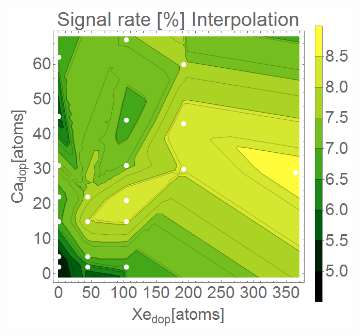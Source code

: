 \begin{figure}[h!]
\centering
\begin{subfigure}[l]{0.5\textwidth}
\includegraphics[width=1\textwidth]{../Images/results/MIR_He_XeCaDop/interpolationSignalRate2.png} 
\end{subfigure}\hfill



\end{figure}
